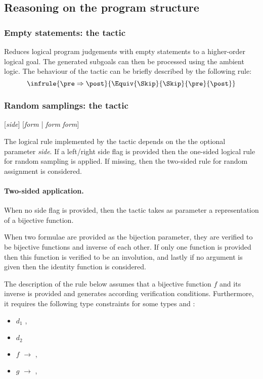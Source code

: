 

\subsection{Reasoning on the program structure}
\subsubsection*{Empty statements: the  tactic}

\Syntax {}

\Description Reduces logical program judgements with empty statements
to a higher-order logical goal. The generated subgoals can then be
processed using the ambient logic. The behaviour of the 
tactic can be briefly described by the following rule:
%
\begin{displaymath}
\infrule{
  \pre \Rightarrow \post
}{
  \Equiv{\Skip}{\Skip}{\pre}{\post}
}
\end{displaymath}
%


\subsubsection*{Random samplings: the  tactic}

\Syntax {}[\textit{side}] [\textit{form} | \textit{form} \textit{form}]

\Description

The logical rule implemented by the  tactic depends on the
the optional parameter \textit{side}. If a left/right side flag is
provided then the one-sided logical rule for random sampling is
applied. If missing, then the two-sided rule for random assignment is
considered.
%

\paragraph*{Two-sided application.} 
When no side flag is provided, then the  tactic takes as
parameter a representation of a bijective function.

When two formulae are provided as the bijection parameter,
they are verified to be bijective functions and inverse of each
other. If only one function is provided then this function is verified
to be an involution, and lastly if no argument is given then the
identity function is considered.

The description of the rule below assumes that a bijective function
$f$ and its inverse is provided and generates according verification
conditions. Furthermore, it requires the following type constraints
for some types  and : 
\begin{itemize}
\item $d_1$ , 
\item $d_2$ 
\item $f$  $\to$ ,
\item $g$  $\to$ , 
\end{itemize}

